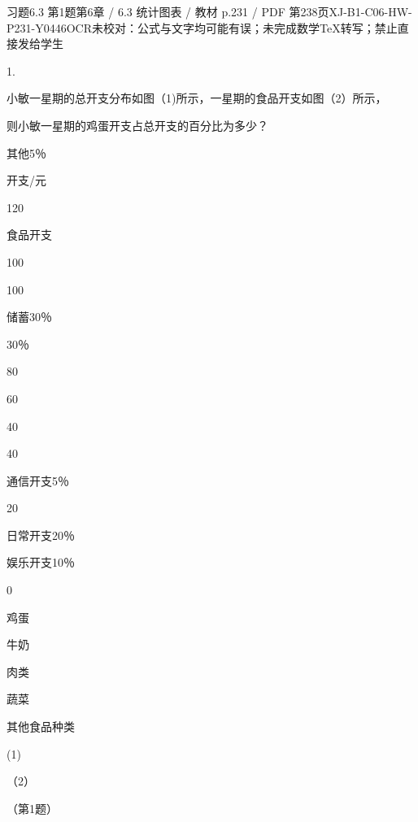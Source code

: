 \begin{bankitem}{习题6.3 第1题}{第6章 / 6.3 统计图表 / 教材 p.231 / PDF 第238页}{XJ-B1-C06-HW-P231-Y0446}{OCR未校对：公式与文字均可能有误；未完成数学TeX转写；禁止直接发给学生}
\begin{ocrdraft}
\par
1.
\par
小敏一星期的总开支分布如图（1)所示，一星期的食品开支如图（2）所示，
\par
则小敏一星期的鸡蛋开支占总开支的百分比为多少？
\par
其他5％
\par
开支/元
\par
120
\par
食品开支
\par
100
\par
100
\par
储蓄30％
\par
30％
\par
80
\par
60
\par
40
\par
40
\par
通信开支5％
\par
20
\par
日常开支20％
\par
娱乐开支10％
\par
0
\par
鸡蛋
\par
牛奶
\par
肉类
\par
蔬菜
\par
其他食品种类
\par
(1)
\par
（2）
\par
（第1题）
\end{ocrdraft}
\end{bankitem}
